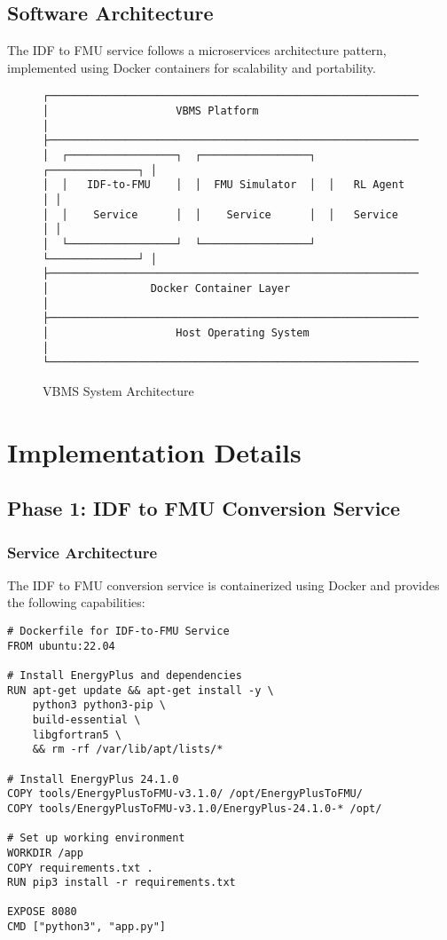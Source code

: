 \documentclass[12pt,a4paper]{article}
\begin{document}
\subsection{Software Architecture}

The IDF to FMU service follows a microservices architecture pattern, implemented using Docker containers for scalability and portability.

\begin{figure}[h]
\centering
\begin{verbatim}
┌─────────────────────────────────────────────────────────────┐
│                    VBMS Platform                            │
├─────────────────────────────────────────────────────────────┤
│  ┌─────────────────┐  ┌─────────────────┐  ┌──────────────┐ │
│  │   IDF-to-FMU    │  │  FMU Simulator  │  │   RL Agent   │ │
│  │    Service      │  │    Service      │  │   Service    │ │
│  └─────────────────┘  └─────────────────┘  └──────────────┘ │
├─────────────────────────────────────────────────────────────┤
│                Docker Container Layer                       │
├─────────────────────────────────────────────────────────────┤
│                    Host Operating System                    │
└─────────────────────────────────────────────────────────────┘
\end{verbatim}
\caption{VBMS System Architecture}
\end{figure}

\section{Implementation Details}

\subsection{Phase 1: IDF to FMU Conversion Service}

\subsubsection{Service Architecture}

The IDF to FMU conversion service is containerized using Docker and provides the following capabilities:

\begin{lstlisting}[style=python, caption=Docker Service Configuration]
# Dockerfile for IDF-to-FMU Service
FROM ubuntu:22.04

# Install EnergyPlus and dependencies
RUN apt-get update && apt-get install -y \
    python3 python3-pip \
    build-essential \
    libgfortran5 \
    && rm -rf /var/lib/apt/lists/*

# Install EnergyPlus 24.1.0
COPY tools/EnergyPlusToFMU-v3.1.0/ /opt/EnergyPlusToFMU/
COPY tools/EnergyPlusToFMU-v3.1.0/EnergyPlus-24.1.0-* /opt/

# Set up working environment
WORKDIR /app
COPY requirements.txt .
RUN pip3 install -r requirements.txt

EXPOSE 8080
CMD ["python3", "app.py"]
\end{lstlisting}
\end{document}
